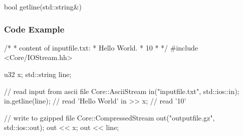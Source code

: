 \begin{fdoc}{bool getline(std::string\&)}
\end{fdoc}

\subsubsection*{Code Example}

\begin{code}
/* 
 * content of inputfile.txt:
 * Hello World.
 * 10
 *
 */
#include <Core/IOStream.hh>

u32 x;
std::string line;

// read input from ascii file
Core::AsciiStream in("inputfile.txt", std::ios::in);
in.getline(line); // read 'Hello World'
in >> x; // read '10'

// write to gzipped file
Core::CompressedStream out("outputfile.gz", std::ios::out);
out << x;
out << line;
\end{code}

